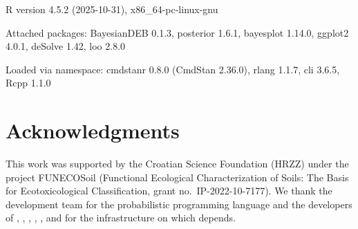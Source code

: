 \documentclass[article,shortnames]{jss}
\begin{document}
\begin{CodeChunk}
\begin{CodeOutput}
R version 4.5.2 (2025-10-31), x86_64-pc-linux-gnu

Attached packages:
  BayesianDEB 0.1.3, posterior 1.6.1, bayesplot 1.14.0,
  ggplot2 4.0.1, deSolve 1.42, loo 2.8.0

Loaded via namespace:
  cmdstanr 0.8.0 (CmdStan 2.36.0), rlang 1.1.7,
  cli 3.6.5, Rcpp 1.1.0
\end{CodeOutput}
\end{CodeChunk}


\section*{Acknowledgments}

This work was supported by the Croatian Science Foundation (HRZZ)
under the project FUNECOSoil (Functional Ecological
Characterization of Soils: The Basis for Ecotoxicological
Classification, grant no.\ IP-2022-10-7177).  We thank the
 development team \citep{CarpenterStan2017} for
the probabilistic programming language and the developers of
 \citep{Gabrycmdstanr2024}, ,
 \citep{VehtariLOO2017}, 
\citep{GabryPPC2019},  \citep{Wickhamggplot2016},
and  \citep{SoetaertdeSolve2010} for the
 infrastructure on which  depends.



\end{document}
